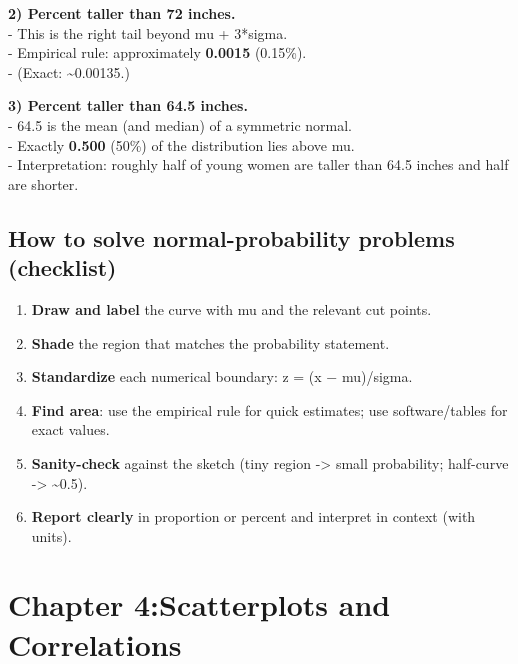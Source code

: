 \documentclass[
  letterpaper,
  DIV=11,
  numbers=noendperiod]{scrreprt}
\providecommand{\tightlist}{%
  \setlength{\itemsep}{0pt}\setlength{\parskip}{0pt}}
\begin{document}
\textbf{2) Percent taller than 72 inches.}\\
- This is the right tail beyond mu + 3*sigma.\\
- Empirical rule: approximately \textbf{0.0015} (0.15\%).\\
- (Exact: \textasciitilde0.00135.)

\textbf{3) Percent taller than 64.5 inches.}\\
- 64.5 is the mean (and median) of a symmetric normal.\\
- Exactly \textbf{0.500} (50\%) of the distribution lies above mu.\\
- Interpretation: roughly half of young women are taller than 64.5
inches and half are shorter.

\section{How to solve normal-probability problems
(checklist)}\label{how-to-solve-normal-probability-problems-checklist}

\begin{enumerate}
\def\labelenumi{\arabic{enumi})}
\tightlist
\item
  \textbf{Draw and label} the curve with mu and the relevant cut
  points.\\
\item
  \textbf{Shade} the region that matches the probability statement.\\
\item
  \textbf{Standardize} each numerical boundary: z = (x − mu)/sigma.\\
\item
  \textbf{Find area}: use the empirical rule for quick estimates; use
  software/tables for exact values.\\
\item
  \textbf{Sanity-check} against the sketch (tiny region -\textgreater{}
  small probability; half-curve -\textgreater{} \textasciitilde0.5).\\
\item
  \textbf{Report clearly} in proportion or percent and interpret in
  context (with units).
\end{enumerate}


\chapter{Chapter 4:Scatterplots and
Correlations}\label{chapter-4scatterplots-and-correlations}
\end{document}

